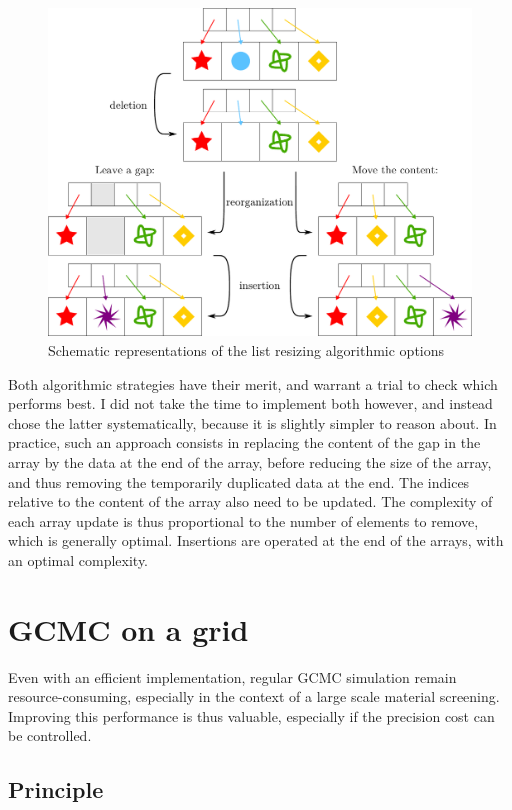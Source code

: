 \documentclass[main.tex]{subfiles}
\begin{document}
\begin{figure}
	\centering
	\includegraphics[width=\linewidth]{figures/gcmc/resizelist.pdf}
	\caption{Schematic representations of the list resizing algorithmic options}\label{fig:resizelist}
\end{figure}

Both algorithmic strategies have their merit, and warrant a trial to check which performs best. I did not take the time to implement both however, and instead chose the latter systematically, because it is slightly simpler to reason about. In practice, such an approach consists in replacing the content of the gap in the array by the data at the end of the array, before reducing the size of the array, and thus removing the temporarily duplicated data at the end. The indices relative to the content of the array also need to be updated. The complexity of each array update is thus proportional to the number of elements to remove, which is generally optimal. Insertions are operated at the end of the arrays, with an optimal complexity.

\section{GCMC on a grid}

Even with an efficient implementation, regular GCMC simulation remain resource-consuming, especially in the context of a large scale material screening. Improving this performance is thus valuable, especially if the precision cost can be controlled.

\subsection{Principle}
\end{document}
